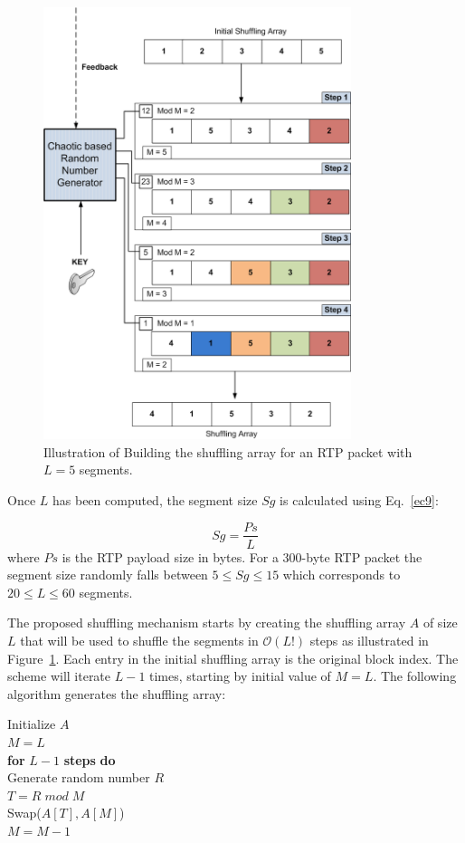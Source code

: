 \documentclass[preprint]{elsarticle}
\begin{document}
\begin{figure}[!ht]
\centering
\includegraphics[width=9cm]{figure4.png}
\caption{Illustration of Building the shuffling array for an RTP packet with $L=5$ segments.}
\label{f4}
\end{figure} 

Once $L$ has been computed, the segment size $Sg$ is calculated using Eq.~\ref{ec9}:

\begin{equation}
Sg = \frac{Ps}{L}
\label{ec9}
\end{equation}
where $Ps$ is the RTP payload size in bytes. For a 300-byte RTP packet the segment size randomly falls between $5\leq Sg \leq 15$ which corresponds to $20 \leq L \leq 60$ segments.

The proposed shuffling mechanism starts by creating the shuffling array $A$ of size $L$ that will be used to shuffle the segments in $\mathcal{O}(L!)$ steps as illustrated in Figure~\ref{f4}. Each entry in the initial shuffling array is the original block index. The scheme will iterate $L-1$ times, starting by initial value of $M = L$. The following algorithm generates the shuffling array:


\noindent \hspace*{30mm} Initialize $A$ \\
\hspace*{30mm} $M=L$   \\
\hspace*{30mm} \textbf{for} $L-1$ \textbf{steps} \textbf{do} \\
\hspace*{35mm} Generate random number $R$ \\
\hspace*{35mm} $T = R\; mod \; M$ \\ 
\hspace*{35mm} Swap($A[T], A[M]$) \\
\hspace*{35mm} $M=M-1$ 
\end{document}
